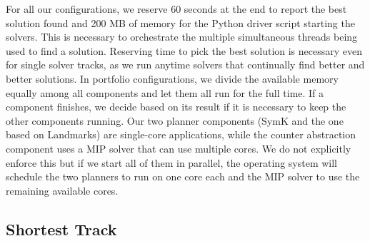 \documentclass{article}
\renewcommand{\todo}[1]{} %
\begin{document}
For all our configurations, we reserve 60 seconds at the end to report the best solution found and 200 MB of memory for the Python driver script starting the solvers. This is necessary to orchestrate the multiple simultaneous threads being used to find a solution. Reserving time to pick the best solution is necessary even for single solver tracks, as we run anytime solvers that continually find better and better solutions. In portfolio configurations, we divide the available memory equally among all components and let them all run for the full time. If a component finishes, we decide based on its result if it is necessary to keep the other components running. Our two planner components (SymK and the one based on Landmarks) are single-core applications, while the counter abstraction component uses a MIP solver that can use multiple cores. We do not explicitly enforce this but if we start all of them in parallel, the operating system will schedule the two planners to run on one core each and the MIP solver to use the remaining available cores.

\todo{\begin{itemize}
    \item For all our configurations, we reserve 60 seconds at the end to report
    the best solution found and 200 MB of memory for the Python driver script
    starting the solvers.
    \item Reserving time to pick the best solution is necessary even for single solver tracks, as we run anytime solvers that continually find better and better solutions.
    \item In portfolio configurations, we devide the available memory equally among all components and let them all run for the full time.
    \item If a component finishes, we decide based on its result if it is necessary to keep the other components running.
    \item Our two planner components (SymK and the one based on Landmarks) are single-core applications, while the counter abstraction component uses a MIP solver that can use multiple cores.
    We do not explicitly enforce this but if we start all of them in parallel, the operating system will schedule the two planners to run on one core each and the MIP solver to use the remaining available cores.
\end{itemize}}

\subsection{Shortest Track}
\end{document}
